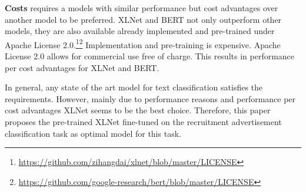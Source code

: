 \par
\textbf{Costs} requires a models with similar performance but cost advantages over another model to be preferred. XLNet and BERT not only outperform other models, they are also available already implemented and pre-trained under Apache License 2.0.\footnote{\url{https://github.com/zihangdai/xlnet/blob/master/LICENSE}}\footnote{\url{https://github.com/google-research/bert/blob/master/LICENSE}}
Implementation and pre-training is expensive.\autocites{Devlin.2018}{Yang.2019}{Lan.2019} Apache License 2.0 allows for commercial use free of charge. This results in performance per cost advantages for XLNet and BERT.
\par
In general, any state of the art model for text classification satisfies the requirements. However, mainly due to performance reasons and performance per cost advantages XLNet seems to be the best choice. Therefore, this paper proposes the pre-trained XLNet fine-tuned on the recruitment advertisement classification task as optimal model for this task.



